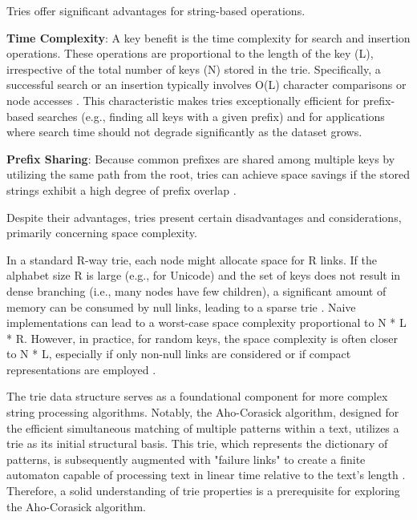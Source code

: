 
Tries offer significant advantages for string-based operations.

\textbf{Time Complexity}: A key benefit is the time complexity for search and insertion operations. These operations are proportional to the length of the key (L), irrespective of the total number of keys (N) stored in the trie. Specifically, a successful search or an insertion typically involves O(L) character comparisons or node accesses \cite{SedgewickWayne2011}. This characteristic makes tries exceptionally efficient for prefix-based searches (e.g., finding all keys with a given prefix) and for applications where search time should not degrade significantly as the dataset grows.

\textbf{Prefix Sharing}: Because common prefixes are shared among multiple keys by utilizing the same path from the root, tries can achieve space savings if the stored strings exhibit a high degree of prefix overlap \cite{Fredkin1960}.


Despite their advantages, tries present certain disadvantages and considerations, primarily concerning space complexity.

In a standard R-way trie, each node might allocate space for R links. If the alphabet size R is large (e.g., for Unicode) and the set of keys does not result in dense branching (i.e., many nodes have few children), a significant amount of memory can be consumed by null links, leading to a sparse trie \cite{Knuth1998, SedgewickWayne2011}. Naive implementations can lead to a worst-case space complexity proportional to N * L * R. However, in practice, for random keys, the space complexity is often closer to N * L, especially if only non-null links are considered or if compact representations are employed \cite{Knuth1998, SedgewickWayne2011}.


The trie data structure serves as a foundational component for more complex string processing algorithms. Notably, the Aho-Corasick algorithm, designed for the efficient simultaneous matching of multiple patterns within a text, utilizes a trie as its initial structural basis. This trie, which represents the dictionary of patterns, is subsequently augmented with "failure links" to create a finite automaton capable of processing text in linear time relative to the text's length \cite{AhoCorasick1975}. Therefore, a solid understanding of trie properties is a prerequisite for exploring the Aho-Corasick algorithm.


